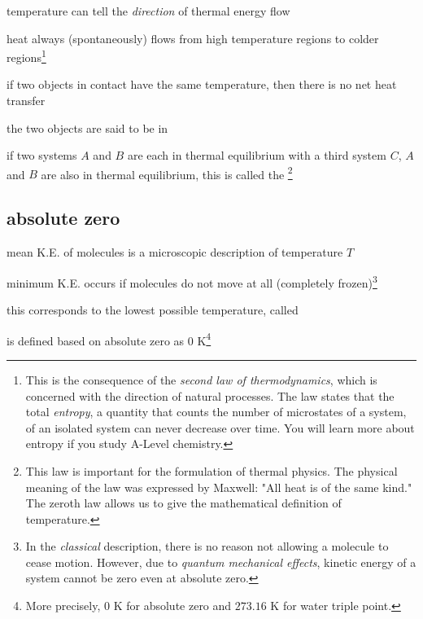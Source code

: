 temperature can tell the \emph{direction} of thermal energy flow

heat always (spontaneously) flows from high temperature regions to colder regions\footnote{This is the consequence of the \emph{second law of thermodynamics}, which is concerned with the direction of natural processes. The law states that the total \emph{entropy}, a quantity that counts the number of microstates of a system, of an isolated system can never decrease over time. You will learn more about entropy if you study A-Level chemistry.}

\cmt if two objects in contact have the same temperature, then there is no net heat transfer

the two objects are said to be in 

\cmt if two systems $A$ and $B$ are each in thermal equilibrium with a third system $C$, $A$ and $B$ are also in thermal equilibrium, this is called the 
\footnote{This law is important for the formulation of thermal physics. The physical meaning of the law was expressed by Maxwell: "All heat is of the same kind." The zeroth law allows us to give the mathematical definition of temperature.}


\subsection{absolute zero}\label{s-abs-zero}

mean K.E. of molecules is a microscopic description of temperature $T$

minimum K.E. occurs if molecules do not move at all (completely frozen)\footnote{In the \emph{classical} description, there is no reason not allowing a molecule to cease motion. However, due to \emph{quantum mechanical effects}, kinetic energy of a system cannot be zero even at absolute zero.}

this corresponds to the lowest possible temperature, called 

\cmt {} is defined based on absolute zero as 0 K\footnote{More precisely, 0 K for absolute zero  and $273.16\text{ K}$ for water triple point.}

